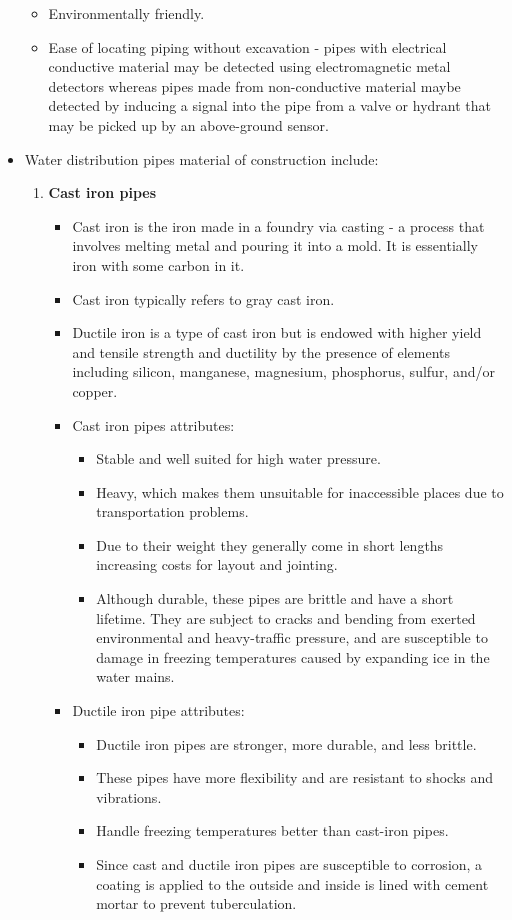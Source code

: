 \begin{itemize}
\begin{itemize}
\item Environmentally friendly.
\item Ease of locating piping without excavation - pipes with electrical conductive material may be detected using electromagnetic metal detectors whereas pipes made from non-conductive material maybe detected by inducing a signal into the pipe from a valve or hydrant that may be picked up by an above-ground sensor.
\end{itemize}
\item Water distribution pipes material of construction include:
\begin{enumerate}
\item \textbf{Cast iron pipes}
\begin{itemize}
\item Cast iron is the iron made in a foundry via casting - a process that involves melting metal and pouring it into a mold.  It is essentially iron with some carbon in it.  
\item Cast iron typically refers to gray cast iron.  
\item Ductile iron is a type of cast iron but is endowed with higher yield and tensile strength and ductility by the presence of elements including silicon, manganese, magnesium, phosphorus, sulfur, and/or copper.
\item Cast iron pipes attributes:
\begin{itemize}
\item Stable and well suited for high water pressure.
\item  Heavy, which makes them unsuitable for inaccessible places due to transportation problems. 
\item Due to their weight they generally come in short lengths increasing costs for layout and jointing. 
\item Although durable, these pipes are brittle and have a short lifetime. They are subject to cracks and bending from exerted environmental and heavy-traffic pressure, and are susceptible to damage in freezing temperatures caused by expanding ice in the water mains.  
\end{itemize}
\item Ductile iron pipe attributes:
\begin{itemize}
\item Ductile iron pipes are stronger, more durable, and less brittle. 
\item These pipes have more flexibility and are resistant to shocks and vibrations. 
\item Handle freezing temperatures better than cast-iron pipes.
\item Since cast and ductile iron pipes are susceptible to corrosion, a coating is applied to the outside and inside is lined with cement mortar to prevent tuberculation. 
\end{itemize}
\end{itemize}


\end{enumerate}
\end{itemize}
